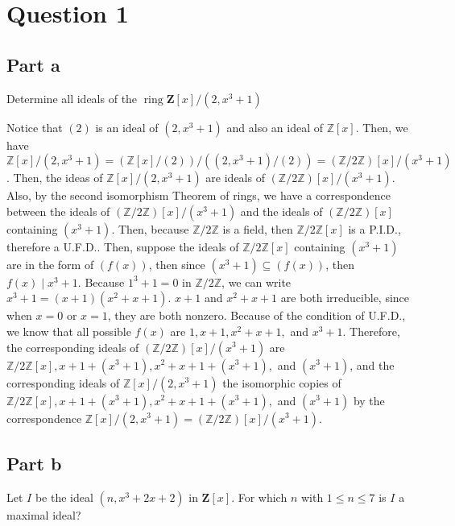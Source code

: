 \section{Question 1}

\subsection{Part a}

\begin{question}
    Determine all ideals of the $\operatorname{ring} \mathbf{Z}[x] /\left(2, x^3+1\right)$
\end{question}

\begin{answer}
    Notice that $(2)$ is an ideal of $(2,x^3+1)$ and also an ideal of $\mathbb{Z}[x]$. Then, we have $\mathbb{Z}[x]/(2,x^3+1) = (\mathbb{Z}[x]/(2))/((2,x^3+1)/(2)) = (\mathbb{Z}/2\mathbb{Z})[x]/(x^3+1)$. Then, the ideas of $\mathbb{Z}[x]/(2,x^3+1)$ are ideals of $(\mathbb{Z}/2\mathbb{Z})[x]/(x^3+1)$. Also, by the second isomorphism Theorem of rings, we have a correspondence between the ideals of $(\mathbb{Z}/2\mathbb{Z})[x]/(x^3+1)$ and the ideals of $(\mathbb{Z}/2\mathbb{Z})[x]$ containing $(x^3 + 1)$. Then, because $\mathbb{Z}/2\mathbb{Z}$ is a field, then $\mathbb{Z}/2\mathbb{Z}[x]$ is a P.I.D., therefore a U.F.D.. Then, suppose the ideals of $\mathbb{Z}/2\mathbb{Z}[x]$ containing $(x^3+1)$ are in the form of $(f(x))$, then since $(x^3 + 1) \subseteq (f(x))$, then $f(x) \mid x^3 + 1$. Because $1^3+1 = 0$ in $\mathbb{Z}/2\mathbb{Z}$, we can write $x^3 + 1 = (x+1)(x^2+x+1)$. $x+1$ and $x^2+x+1$ are both irreducible, since when $x = 0$ or $x = 1$, they are both nonzero. Because of the condition of U.F.D., we know that all possible $f(x)$ are $1,x+1,x^2+x+1,$ and $x^3+1$. Therefore, the corresponding ideals of $(\mathbb{Z}/2\mathbb{Z})[x]/(x^3+1)$ are $\mathbb{Z}/2\mathbb{Z}[x], x+1+(x^3+1), x^2+x+1+(x^3+1),$ and $(x^3+1)$, and the corresponding ideals of $\mathbb{Z}[x]/(2,x^3+1)$ the isomorphic copies of $\mathbb{Z}/2\mathbb{Z}[x], x+1+(x^3+1), x^2+x+1+(x^3+1),$ and $(x^3+1)$ by the correspondence $\mathbb{Z}[x]/(2,x^3+1) = (\mathbb{Z}/2\mathbb{Z})[x]/(x^3+1)$.
\end{answer}

\subsection{Part b}

\begin{question}
    Let $I$ be the ideal $\left(n, x^3+2 x+2\right)$ in $\mathbf{Z}[x]$. For which $n$ with $1 \leq n \leq 7$ is $I$ a maximal ideal?
\end{question}

